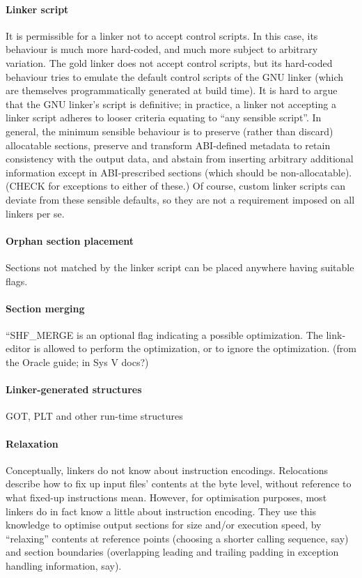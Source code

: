 \paragraph{Linker script}
It is permissible for a linker not to accept control scripts.
In this case, its behaviour is much more hard-coded,
and much more subject to arbitrary variation.
The \textsf{gold} linker does not accept control scripts, 
but its hard-coded behaviour tries to emulate the default control scripts of the GNU linker
(which are themselves programmatically generated at build time).
It is hard to argue that the GNU linker's script is definitive; 
in practice, a linker not accepting a linker script
adheres to looser criteria equating to ``any sensible script''.
In general, the minimum sensible 
behaviour is to preserve (rather than discard) allocatable sections, 
preserve and transform ABI-defined metadata to retain consistency with the output data,
and abstain from inserting arbitrary additional information
except in ABI-prescribed sections (which should be non-allocatable).  (CHECK for exceptions to either of these.)
Of course, custom linker scripts can deviate from these sensible defaults,
so they are not a requirement imposed on all linkers per se.

\paragraph{Orphan section placement}
Sections not matched by the linker script can be placed anywhere
having suitable flags.

\paragraph{Section merging}
``SHF\_MERGE is an optional flag indicating a possible optimization. The link-editor is allowed to perform the optimization, or to ignore the optimization. 
(from the Oracle guide; in Sys V docs?)

\paragraph{Linker-generated structures}
GOT, PLT and other run-time structures

\paragraph{Relaxation}
Conceptually, linkers do not know about instruction encodings.
Relocations describe how to fix up input files' contents at the byte level,
without reference to what fixed-up instructions mean.
However, for optimisation purposes, most linkers do in fact
know a little about instruction encoding.
They use this knowledge to optimise output sections
for size and/or execution speed, by ``relaxing'' contents
at reference points (choosing a shorter calling sequence, say) 
and section boundaries (overlapping leading and trailing padding in exception
handling information, say).
